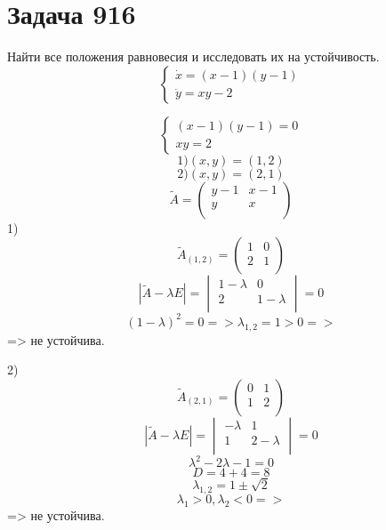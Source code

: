 \section*{Задача 916}
Найти все положения равновесия и исследовать их на устойчивость.
$$
\begin{cases}
\dot{x} = (x - 1)(y - 1) \\
\dot{y} = xy - 2
\end{cases}
$$

\begin{solution}
    $$ 
    \begin{cases}
        (x - 1)(y - 1) = 0 \\
        xy = 2
    \end{cases} 
    $$
    $$ 1)
    (x, y) = (1, 2)
    $$
    $$ 2)
    (x, y) = (2, 1)
    $$
    $$ \tilde{A} = \begin{pmatrix}
        y - 1 & x - 1 \\
        y & x \\
    \end{pmatrix} $$
    1)
    $$\tilde{A}_{(1, 2)} = \begin{pmatrix}
        1 & 0 \\
        2 & 1 \\
    \end{pmatrix} $$
    $$ |\tilde{A} - \lambda E| = \begin{vmatrix}
        1 - \lambda & 0 \\
        2 & 1 - \lambda \\
    \end{vmatrix} = 0 $$
    $$ (1 - \lambda)^2 = 0 => \lambda_{1, 2} = 1 > 0 => $$
    => не устойчива. \par
    2) $$\tilde{A}_{(2, 1)} = \begin{pmatrix}
        0 & 1 \\
        1 & 2 \\
    \end{pmatrix} $$
    $$ |\tilde{A} - \lambda E| = \begin{vmatrix}
        -\lambda & 1 \\
        1 & 2 - \lambda \\
    \end{vmatrix} = 0 $$
    $$ \lambda^2 - 2\lambda - 1 = 0 $$
    $$ D = 4 + 4 = 8 $$
    $$ \lambda_{1, 2} = 1 \pm \sqrt{2} $$
    $$ \lambda_1 > 0, \lambda_2 < 0 => $$
    => не устойчива.
    
\end{solution}\pagebreak